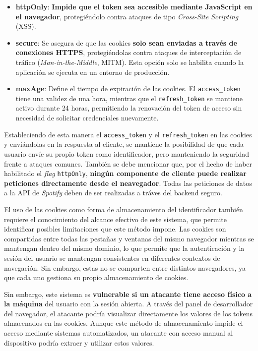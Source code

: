 \setlength{\itemsep}{0pt}
\begin{itemize}
    \item \textbf{httpOnly}: \textbf{Impide que el token sea accesible mediante JavaScript en el navegador}, protegiéndolo contra ataques de tipo \textit{Cross-Site Scripting} (XSS).
    \item \textbf{secure}: Se asegura de que las cookies \textbf{solo sean enviadas a través de conexiones HTTPS}, protegiéndolas contra ataques de interceptación de tráfico (\textit{Man-in-the-Middle}, MITM). Esta opción solo se habilita cuando la aplicación se ejecuta en un entorno de producción.
    \item \textbf{maxAge}: Define el tiempo de expiración de las cookies. El \texttt{access\_token} tiene una validez de una hora, mientras que el \texttt{refresh\_token} se mantiene activo durante 24 horas, permitiendo la renovación del token de acceso sin necesidad de solicitar credenciales nuevamente.
\end{itemize}

Estableciendo de esta manera el \texttt{access\_token} y el \texttt{refresh\_token} en las cookies y enviándolas en la respuesta al cliente, se mantiene la posibilidad de que cada usuario envíe su propio token como identificador, pero manteniendo la seguridad frente a ataques comunes. También se debe mencionar que, por el hecho de haber habilitado el \textit{flag} \texttt{httpOnly}, \textbf{ningún componente de cliente puede realizar peticiones directamente desde el neavegador}. Todas las peticiones de datos a la API de \textit{Spotify} deben de ser realizadas a tráves del backend seguro.

El uso de las cookies como forma de almacenamiento del identificador también requiere el conocimiento del alcance efectivo de este sistema, que permite identificar posibles limitaciones que este método impone. Las cookies son compartidas entre todas las pestañas y ventanas del mismo navegador mientras se mantengan dentro del mismo dominio, lo que permite que la autenticación y la sesión del usuario se mantengan consistentes en diferentes contextos de navegación. Sin embargo, estas no se comparten entre distintos navegadores, ya que cada uno gestiona su propio almacenamiento de cookies.

Sin embargo, este sistema es \textbf{vulnerable si un atacante tiene acceso físico a la máquina} del usuario con la sesión abierta. A través del panel de desarrollador del navegador, el atacante podría visualizar directamente los valores de los tokens almacenados en las cookies. Aunque este método de almacenamiento impide el acceso mediante sistemas automatizados, un atacante con acceso manual al dispositivo podría extraer y utilizar estos valores.

